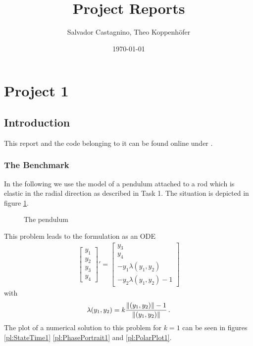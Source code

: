 \documentclass{report}
\title{Project Reports}
\author{Salvador Castagnino, Theo Koppenhöfer}
\date{\today}
\DeclarePairedDelimiter{\norm}{\lVert}{\rVert}
\newcommand{\vect}[1]{\begin{bmatrix} #1 \end{bmatrix}}
\begin{document}
\maketitle

\chapter*{Project 1}

\section*{Introduction}

This report and the code belonging to it can be found online under \cite{Repository}.

\subsection*{The Benchmark}

In the following we use the model of a pendulum attached to a rod which is elastic in the radial direction as described in Task 1. The situation is depicted in figure \ref{dr:Pendulum}.

\begin{figure}
\centering

\caption{The pendulum}
\label{dr:Pendulum}
\end{figure}

This problem leads to the formulation as an ODE
\begin{align*}
	\vect{y_1 \\ y_2 \\ y_3 \\ y_4}' = \vect{y_3 \\ y_4 \\ -y_1\lambda(y_1,y_2) \\ -y_2\lambda(y_1,y_2)-1}
\end{align*}
with
\begin{align*}
	\lambda(y_1,y_2)=k\frac{\norm{(y_1,y_2)}-1}{\norm{(y_1,y_2)}}\,.
\end{align*}
The plot of a numerical solution to this problem for $k=1$ can be seen in figures \ref{pl:StateTime1} \ref{pl:PhasePortrait1} and \ref{pl:PolarPlot1}.
\end{document}
